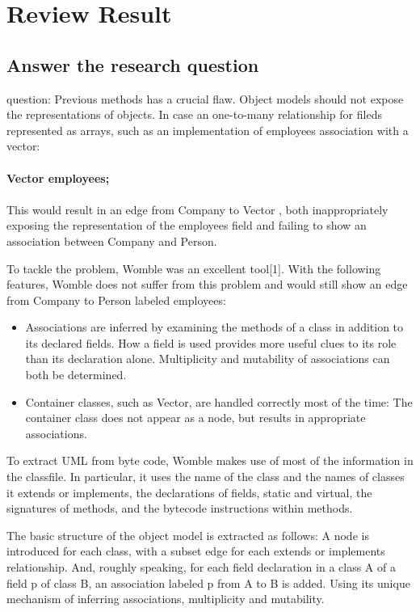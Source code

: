\documentclass{article}
\begin{document}
\section{Review Result}

\subsection{Answer the research question}
question:  Previous methods has a crucial flaw.  Object models should not expose the representations of objects.
In case an one-to-many relationship for fileds represented as arrays, such as
an implementation of employees association with a vector:
\\
\\
\textbf{Vector employees;}
\\
\\This would result in an edge from Company to Vector , both
inappropriately exposing the representation of the
employees field and failing to show an association between
Company and Person.


To tackle the problem, Womble was an excellent tool[1].
With the following features, Womble does not suffer from this problem and
would still show an edge from Company to Person labeled
employees:
\begin{itemize}
    \item Associations are inferred by examining the methods
    of a class in addition to its declared fields. How a
    field is used provides more useful clues to its role
    than its declaration alone. Multiplicity and mutability of associations can both be determined.
    \item Container classes, such as Vector, are handled
    correctly most of the time: The container class does
    not appear as a node, but results in appropriate associations.
\end{itemize}


To extract UML from byte code, Womble makes use of most of the information in the
classfile. In particular, it uses the name of the class and the
names of classes it extends or implements, the declarations
of fields, static and virtual, the signatures of methods, and
the bytecode instructions within methods.


The basic structure of the object model is extracted as
follows: A node is introduced for each class, with a subset
edge for each extends or implements relationship. And,
roughly speaking, for each field declaration in a class A
of a field p of class B, an association labeled p from
A to B is added. Using its unique mechanism of inferring associations,
multiplicity and mutability.
\end{document}
